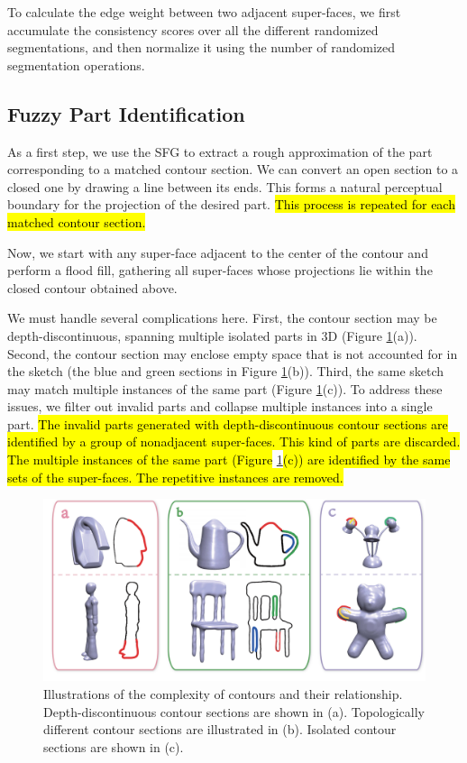 To calculate the edge weight between two adjacent super-faces, we first accumulate the consistency scores over all the different randomized segmentations, and then normalize it using the number of randomized segmentation operations.

\subsection{Fuzzy Part Identification}
As a first step, we use the SFG to extract a rough approximation of the part corresponding to a matched contour section. We can convert an open section to a closed one by drawing a line between its ends. This forms a natural perceptual boundary for the projection of the desired part. \hl{This process is repeated for each matched contour section.}

Now, we start with any super-face adjacent to the center of the contour and perform a flood fill, gathering all super-faces whose projections lie within the closed contour obtained above.

We must handle several complications here. First, the contour section may be depth-discontinuous, spanning multiple isolated parts in 3D (Figure \ref{fig:ComplexCtour}(a)). Second, the contour section may enclose empty space that is not accounted for in the sketch (the blue and green sections in Figure \ref{fig:ComplexCtour}(b)). Third, the same sketch may match multiple instances of the same part (Figure \ref{fig:ComplexCtour}(c)). To address these issues, we filter out invalid parts and collapse multiple instances into a single part. \hl{The invalid parts generated with depth-discontinuous contour sections are identified by a group of nonadjacent super-faces. This kind of parts are discarded. The multiple instances of the same part (Figure }\ref{fig:ComplexCtour}\hl{(c)) are identified by the same sets of the super-faces. The repetitive instances are removed.}

\begin{figure}\centering
\includegraphics[width=\linewidth]{./Material/ComplexCtour.pdf}
\caption{Illustrations of the complexity of contours and their relationship. Depth-discontinuous contour sections are shown in (a). Topologically different contour sections are illustrated in (b). Isolated contour sections are shown in (c).}\label{fig:ComplexCtour}
\end{figure}

